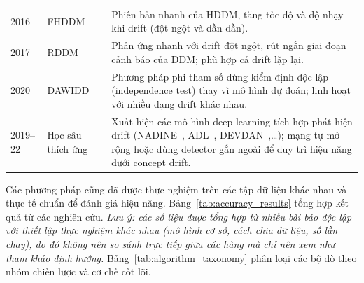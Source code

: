 \begin{table}[H]
\begin{tabular}{@{}p{1.2cm}p{2.8cm}p{9cm}@{}}
		2016         & FHDDM~\cite{pesaranghader2016fhddm} & Phiên bản nhanh của HDDM, tăng tốc độ và độ nhạy khi drift (đột ngột và dần dần).                                                                                                       \\
		2017         & RDDM~\cite{barros2017rddm}          & Phản ứng nhanh với drift đột ngột, rút ngắn giai đoạn cảnh báo của DDM; phù hợp cả drift lặp lại.                                                                                       \\
		2020         & DAWIDD~\cite{hinder2020dawidd}      & Phương pháp phi tham số dùng kiểm định độc lập (independence test) thay vì mô hình dự đoán; linh hoạt với nhiều dạng drift khác nhau.                                                   \\
		2019--22     & Học sâu thích ứng                   & Xuất hiện các mô hình deep learning tích hợp phát hiện drift (NADINE~\cite{pratama2019automatic}, ADL~\cite{ashfahani2019adl}, DEVDAN~\cite{ashfahani2020devdan},…); mạng tự mở rộng hoặc dùng detector gắn ngoài để duy trì hiệu năng dưới concept drift. \\
		\bottomrule
	\end{tabular}
\end{table}
Các phương pháp cũng đã được thực nghiệm trên các tập dữ liệu khác nhau và thực tế chuẩn để đánh giá hiệu năng. Bảng~\ref{tab:accuracy_results} tổng hợp kết quả từ các nghiên cứu. \textit{Lưu ý: các số liệu được tổng hợp từ nhiều bài báo độc lập với thiết lập thực nghiệm khác nhau (mô hình cơ sở, cách chia dữ liệu, số lần chạy), do đó không nên so sánh trực tiếp giữa các hàng mà chỉ nên xem như tham khảo định hướng.} Bảng~\ref{tab:algorithm_taxonomy} phân loại các bộ dò theo nhóm chiến lược và cơ chế cốt lõi.

